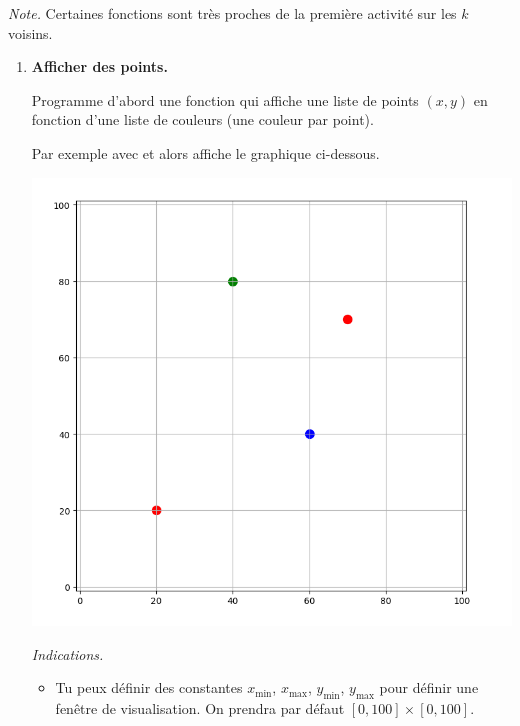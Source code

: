 \documentclass[11pt,class=report,crop=false]{standalone}
\begin{document}

\begin{activite}[Barycentres]
	

\emph{Note.} Certaines fonctions sont très proches de la première activité sur les $k$ voisins.

\begin{enumerate}
	\item \textbf{Afficher des points.}
	
	Programme d'abord une fonction 
	qui affiche une liste de points $(x,y)$ en fonction d'une liste de couleurs (une couleur par point).
	
	Par exemple avec  et 
	alors  affiche le graphique ci-dessous.
	
	\begin{center}
	\includegraphics[scale=\myscale,scale=0.17]{ecran-barycentres-1} 
	\end{center}
	
	\emph{Indications.} 
	\begin{itemize}
		\item Tu peux définir des constantes $x_{\min}$, $x_{\max}$, $y_{\min}$, $y_{\max}$
		pour définir une fenêtre de visualisation. On prendra par défaut $[0,100]\times[0,100]$.
		

\end{itemize}
\end{enumerate}
\end{activite}
\end{document}
